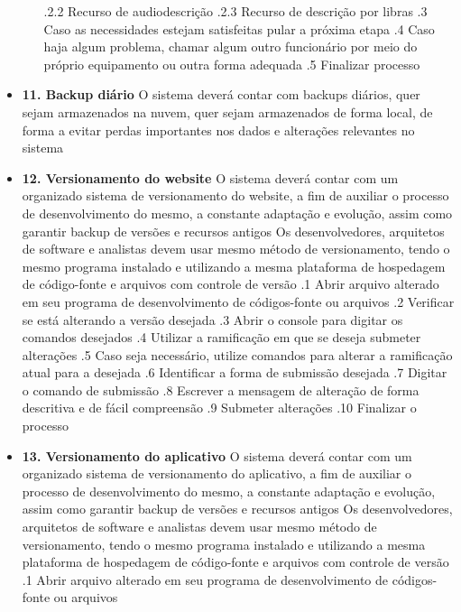 \begin{itemize}[label={}]
\begin{itemize}[label={}]
				.2.2 Recurso de audiodescrição
				.2.3 Recurso de descrição por libras
			.3 Caso as necessidades estejam satisfeitas pular a próxima etapa
			.4 Caso haja algum problema, chamar algum outro funcionário por meio do próprio equipamento ou outra forma adequada
			.5 Finalizar processo
	\end{itemize}
	\item \textbf{11. Backup diário}
		 O sistema deverá contar com backups diários, quer sejam armazenados na nuvem, quer sejam armazenados de forma local, de forma a evitar perdas importantes nos dados e alterações relevantes no sistema
	\item \textbf{12. Versionamento do website}
		 O sistema deverá contar com um organizado sistema de versionamento do website, a fim de auxiliar o processo de desenvolvimento do mesmo, a constante adaptação e evolução, assim como garantir backup de versões e recursos antigos
		 Os desenvolvedores, arquitetos de software e analistas devem usar mesmo método de versionamento, tendo o mesmo programa instalado e utilizando a mesma plataforma de hospedagem de código-fonte e arquivos com controle de versão
			.1 Abrir arquivo alterado em seu programa de desenvolvimento de códigos-fonte ou arquivos
			.2 Verificar se está alterando a versão desejada
			.3 Abrir o console para digitar os comandos desejados
			.4 Utilizar a ramificação em que se deseja submeter alterações
			.5 Caso seja necessário, utilize comandos para alterar a ramificação atual para a desejada
			.6 Identificar a forma de submissão desejada
			.7 Digitar o comando de submissão
			.8 Escrever a mensagem de alteração de forma descritiva e de fácil compreensão
			.9 Submeter alterações
			.10 Finalizar o processo
	\item \textbf{13. Versionamento do aplicativo}
		 O sistema deverá contar com um organizado sistema de versionamento do aplicativo, a fim de auxiliar o processo de desenvolvimento do mesmo, a constante adaptação e evolução, assim como garantir backup de versões e recursos antigos
		 Os desenvolvedores, arquitetos de software e analistas devem usar mesmo método de versionamento, tendo o mesmo programa instalado e utilizando a mesma plataforma de hospedagem de código-fonte e arquivos com controle de versão
			.1 Abrir arquivo alterado em seu programa de desenvolvimento de códigos-fonte ou arquivos

\end{itemize}
